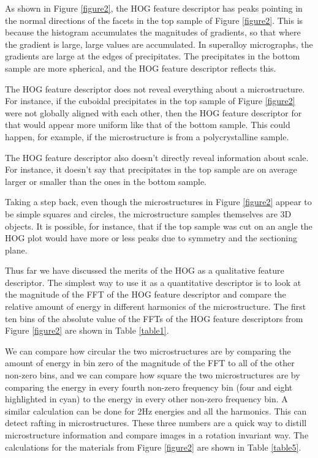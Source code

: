 \documentclass[review]{elsarticle}
\begin{document}
	As shown in Figure \ref{figure2}, the HOG feature descriptor has peaks pointing in the normal directions of the facets in the top sample of Figure \ref{figure2}. This is because the histogram accumulates the magnitudes of gradients, so that where the gradient is large, large values are accumulated. In superalloy micrographs, the gradients are large at the edges of precipitates. The precipitates in the bottom sample are more spherical, and the HOG feature descriptor reflects this.
	
	The HOG feature descriptor does not reveal everything about a microstructure. For instance, if the cuboidal precipitates in the top sample of Figure \ref{figure2} were not globally aligned with each other, then the HOG feature descriptor for that would appear more uniform like that of the bottom sample. This could happen, for example, if the microstructure is from a polycrystalline sample.
	
	The HOG feature descriptor also doesn't directly reveal information about scale. For instance, it doesn't say that precipitates in the top sample are on average larger or smaller than the ones in the bottom sample.
	
	Taking a step back, even though the microstructures in Figure \ref{figure2} appear to be simple squares and circles, the microstructure samples themselves are 3D objects. It is possible, for instance, that if the top sample was cut on an angle the HOG plot would have more or less peaks due to symmetry and the sectioning plane.

	Thus far we have discussed the merits of the HOG as a qualitative feature descriptor. The simplest way to use it as a quantitative descriptor is to look at the magnitude of the FFT of the HOG feature descriptor and compare the relative amount of energy in different harmonics of the microstructure. The first ten bins of the absolute value of the FFTs of the HOG feature descriptors from Figure \ref{figure2} are shown in Table \ref{table1}.
	
  	We can compare how circular the two microstructures are by comparing the amount of energy in bin zero of the magnitude of the FFT to all of the other non-zero bins, and we can compare how square the two microstructures are by comparing the energy in every fourth non-zero frequency bin (four and eight highlighted in cyan) to the energy in every other non-zero frequency bin. A similar calculation can be done for 2Hz energies and all the harmonics. This can detect rafting in microstructures. These three numbers are a quick way to distill microstructure information and compare images in a rotation invariant way. The calculations for the materials from Figure \ref{figure2} are shown in Table \ref{table5}.
	
\end{document}
